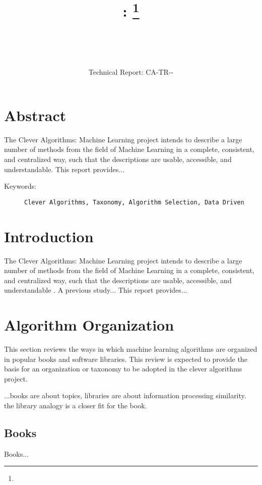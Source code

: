 \documentclass[a4paper, 11pt]{article}
\title{{\myreporttitle}: {\myreportsubtitle}\footnote{\myreportlicense}}
\author{\myreportauthor\\{\myreportemail}\\\small\myreportproject}
\date{\myreportfulldate\\{\small{Technical Report: CA-TR-{\myreportdate}-\myreportversion}}}
\begin{document}
\maketitle

\section*{Abstract} 
The Clever Algorithms: Machine Learning project intends to describe a large number of methods from the field of Machine Learning in a complete, consistent, and centralized way, such that the descriptions are usable, accessible, and understandable.
This report provides...


\begin{description}
	\item[Keywords:] {\small\texttt{Clever Algorithms, Taxonomy, Algorithm Selection, Data Driven}}
\end{description} 

%
%
\section{Introduction}
\label{sec:introduction}
The Clever Algorithms: Machine Learning project intends to describe a large number of methods from the field of Machine Learning in a complete, consistent, and centralized way, such that the descriptions are usable, accessible, and understandable \cite{Brownlee2011a}.
A previous study...
This report provides...


%
%
\section{Algorithm Organization}
\label{sec:organization}
This section reviews the ways in which machine learning algorithms are organized in popular books and software libraries. This review is expected to provide the basis for an organization or taxonomy to be adopted in the clever algorithms project.

...books are about topics, libraries are about information processing similarity. the library analogy is a closer fit for the book.


\subsection{Books}
Books...
\end{document}
